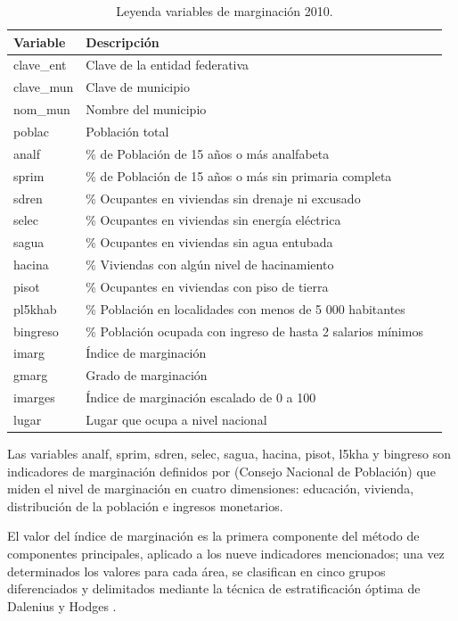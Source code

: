 \begin{table}
\caption[Descripción de la base de datos]
            {Leyenda variables de marginación 2010.}
\label{descripvar}
\begin{tabular}{l p{10cm} r}
\hline
Variable & Descripción \\
\hline 
clave\_ent & Clave de la entidad federativa  \\	
clave\_mun & Clave de municipio	\\
nom\_mun	& Nombre del municipio \\
poblac & Población total \\
analf & \% de Población de 15 años o más analfabeta  \\ 
sprim & \%  de Población de 15 años o más sin primaria completa  \\ 
sdren  & \% Ocupantes en viviendas sin drenaje ni excusado  \\ 
selec & \% Ocupantes en viviendas sin energía eléctrica  \\ 
sagua & \% Ocupantes en viviendas sin agua entubada  \\ 
hacina & \% Viviendas con algún nivel de hacinamiento \\ 
pisot & \% Ocupantes en viviendas con piso de tierra  \\ 
pl5khab & \% Población en localidades con menos de 5 000 habitantes  \\ 
bingreso & \% Población ocupada con ingreso de hasta 2 salarios mínimos \\ 
imarg & Índice de marginación  \\ 
gmarg & Grado de marginación  \\ 
imarges & Índice de marginación escalado de 0 a 100  \\
lugar & Lugar que ocupa a nivel nacional \\
\hline 
\end{tabular} 
\end{table}

Las variables analf, sprim, sdren, selec, sagua, hacina, pisot, l5kha y bingreso son indicadores de marginación definidos por \citet{conapo04} (Consejo Nacional de Población) que miden el nivel de marginación en cuatro dimensiones: educación, vivienda, distribución de la población e ingresos monetarios. 

El valor del índice de marginación es la primera componente del método de componentes principales, aplicado a los nueve indicadores mencionados; una vez determinados los
valores para cada área, se clasifican en cinco grupos diferenciados y delimitados mediante la técnica de estratificación óptima de Dalenius y Hodges \citep{conapo11}.

